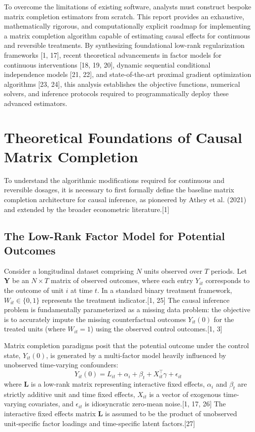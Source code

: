 \documentclass{article}
\begin{document}
To overcome the limitations of existing software, analysts must construct bespoke matrix completion estimators from scratch. This report provides an exhaustive, mathematically rigorous, and computationally explicit roadmap for implementing a matrix completion algorithm capable of estimating causal effects for continuous and reversible treatments. By synthesizing foundational low-rank regularization frameworks [1, 17], recent theoretical advancements in factor models for continuous interventions [18, 19, 20], dynamic sequential conditional independence models [21, 22], and state-of-the-art proximal gradient optimization algorithms [23, 24], this analysis establishes the objective functions, numerical solvers, and inference protocols required to programmatically deploy these advanced estimators.

\section{Theoretical Foundations of Causal Matrix Completion}

To understand the algorithmic modifications required for continuous and reversible dosages, it is necessary to first formally define the baseline matrix completion architecture for causal inference, as pioneered by Athey et al. (2021) and extended by the broader econometric literature.[1]

\subsection{The Low-Rank Factor Model for Potential Outcomes}

Consider a longitudinal dataset comprising $N$ units observed over $T$ periods. Let $\mathbf{Y}$ be an $N \times T$ matrix of observed outcomes, where each entry $Y_{it}$ corresponds to the outcome of unit $i$ at time $t$. In a standard binary treatment framework, $W_{it} \in \{0, 1\}$ represents the treatment indicator.[1, 25] The causal inference problem is fundamentally parameterized as a missing data problem: the objective is to accurately impute the missing counterfactual outcomes $Y_{it}(0)$ for the treated units (where $W_{it} = 1$) using the observed control outcomes.[1, 3]

Matrix completion paradigms posit that the potential outcome under the control state, $Y_{it}(0)$, is generated by a multi-factor model heavily influenced by unobserved time-varying confounders:
$$Y_{it}(0) = L_{it} + \alpha_i + \beta_t + X_{it}^\top \gamma + \epsilon_{it}$$
where $\mathbf{L}$ is a low-rank matrix representing interactive fixed effects, $\alpha_i$ and $\beta_t$ are strictly additive unit and time fixed effects, $X_{it}$ is a vector of exogenous time-varying covariates, and $\epsilon_{it}$ is idiosyncratic zero-mean noise.[1, 17, 26] The interactive fixed effects matrix $\mathbf{L}$ is assumed to be the product of unobserved unit-specific factor loadings and time-specific latent factors.[27]
\end{document}
